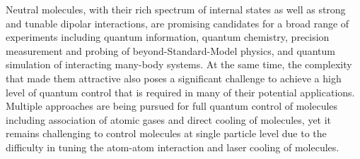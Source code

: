 
Neutral molecules, with their rich spectrum of internal states as well as
strong and tunable dipolar interactions, are promising candidates for
a broad range of experiments including quantum information,
quantum chemistry, precision measurement and probing of beyond-Standard-Model physics,
and quantum simulation of interacting many-body systems.
At the same time, the complexity that made them attractive also poses a significant challenge
to achieve a high level of quantum control that is required in many of
their potential applications.
Multiple approaches are being pursued for full quantum control of molecules
including association of atomic gases and direct cooling of molecules,
yet it remains challenging to control molecules at single particle level
due to the difficulty in tuning the atom-atom interaction
and laser cooling of molecules.

